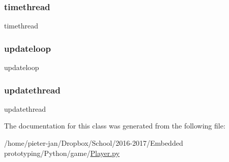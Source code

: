 \hypertarget{classgame_1_1_player_1_1player_abdbd1aa902babb2b61d19e44dcd88412}{}\label{classgame_1_1_player_1_1player_abdbd1aa902babb2b61d19e44dcd88412} 
\subsubsection{\texorpdfstring{timethread}{timethread}}
{\footnotesize\ttfamily timethread}

\hypertarget{classgame_1_1_player_1_1player_a36c4719a5155181787e577197de2f4fd}{}\label{classgame_1_1_player_1_1player_a36c4719a5155181787e577197de2f4fd} 
\subsubsection{\texorpdfstring{updateloop}{updateloop}}
{\footnotesize\ttfamily updateloop}

\hypertarget{classgame_1_1_player_1_1player_a3924cdbb3a2e56cd1ff60d8562e29551}{}\label{classgame_1_1_player_1_1player_a3924cdbb3a2e56cd1ff60d8562e29551} 
\subsubsection{\texorpdfstring{updatethread}{updatethread}}
{\footnotesize\ttfamily updatethread}



The documentation for this class was generated from the following file\+:\begin{DoxyCompactItemize}
\item 
/home/pieter-\/jan/\+Dropbox/\+School/2016-\/2017/\+Embedded prototyping/\+Python/game/\hyperlink{_player_8py}{Player.\+py}\end{DoxyCompactItemize}
